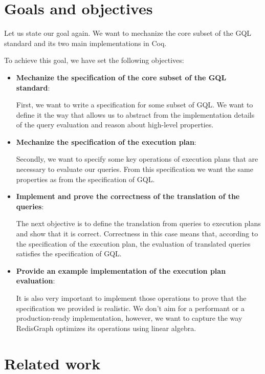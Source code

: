 \documentclass[14pt]{constructor-thesis}
\theoremstyle{definition}
\begin{document}
\section{Goals and objectives}

Let us state our goal again. We want to mechanize the core subset of the GQL standard and its two main implementations in Coq.

To achieve this goal, we have set the following objectives:
\begin{itemize}
  \item \textbf{Mechanize the specification of the core subset of the GQL standard}:
  
  First, we want to write a specification for some subset of GQL. We want to define it the way that allows us to abstract from the implementation details of the query evaluation and reason about high-level properties.

  \item \textbf{Mechanize the specification of the execution plan}:
  
  Secondly, we want to specify some key operations of execution plans that are necessary to evaluate our queries. From this specification we want the same properties as from the specification of GQL.

  \item \textbf{Implement and prove the correctness of the translation of the queries}:
  
  The next objective is to define the translation from queries to execution plans and show that it is correct. Correctness in this case means that, according to the specification of the execution plan, the evaluation of translated queries satisfies the specification of GQL.

  \item \textbf{Provide an example implementation of the execution plan evaluation}:
  
  It is also very important to implement those operations to prove that the specification we provided is realistic. We don't aim for a performant or a production-ready implementation, however, we want to capture the way RedisGraph optimizes its operations using linear algebra.

\end{itemize}

\section{Related work}
\label{section:related-work}
\end{document}
